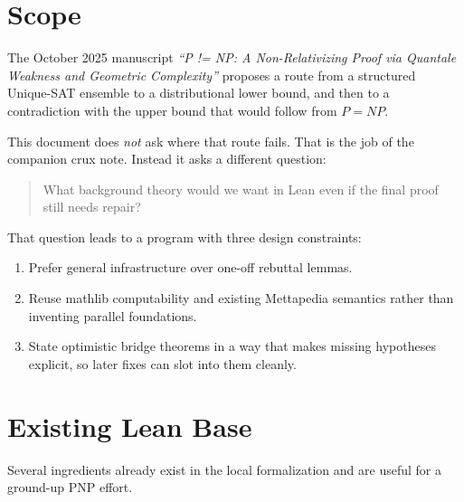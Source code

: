 \documentclass[11pt]{article}
\theoremstyle{remark}
\begin{document}
\tableofcontents

\section{Scope}

The October 2025 manuscript
\emph{``P != NP: A Non-Relativizing Proof via Quantale Weakness and Geometric
Complexity''} proposes a route from a structured Unique-SAT ensemble to a
distributional lower bound, and then to a contradiction with the upper bound that
would follow from $P=NP$.

This document does \emph{not} ask where that route fails.  That is the job of the
companion crux note.  Instead it asks a different question:

\begin{quote}
What background theory would we want in Lean even if the final proof still needs
repair?
\end{quote}

That question leads to a program with three design constraints:
\begin{enumerate}[leftmargin=1.5em]
  \item Prefer general infrastructure over one-off rebuttal lemmas.
  \item Reuse mathlib computability and existing Mettapedia semantics rather than
  inventing parallel foundations.
  \item State optimistic bridge theorems in a way that makes missing hypotheses
  explicit, so later fixes can slot into them cleanly.
\end{enumerate}

\section{Existing Lean Base}

Several ingredients already exist in the local formalization and are useful for a
ground-up PNP effort.
\end{document}
